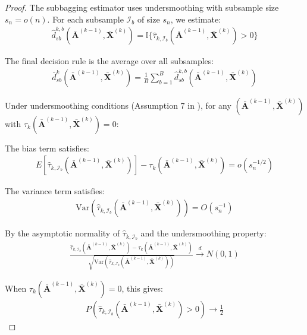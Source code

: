 \documentclass[11pt]{article}
\theoremstyle{referenceplain}
\theoremstyle{referencedefinition}
\theoremstyle{referenceremark}
\begin{document}
\begin{proof}

The subbagging estimator uses undersmoothing with subsample size $s_n = o(n)$. For each subsample $\mathcal{I}_b$ of size $s_n$, we estimate:
\begin{align*}
\widehat{d}_{sb}^{k,b}(\bar{\mathbf{A}}^{(k-1)}, \bar{\mathbf{X}}^{(k)}) = \mathbb{I}\{\widehat{\tau}_{k,\mathcal{I}_b}(\bar{\mathbf{A}}^{(k-1)}, \bar{\mathbf{X}}^{(k)}) > 0\}
\end{align*}

The final decision rule is the average over all subsamples:
\begin{align*}
\bar{d}_{sb}^{k}(\bar{\mathbf{A}}^{(k-1)}, \bar{\mathbf{X}}^{(k)}) = \frac{1}{B} \sum_{b=1}^B \widehat{d}_{sb}^{k,b}(\bar{\mathbf{A}}^{(k-1)}, \bar{\mathbf{X}}^{(k)})
\end{align*}


Under undersmoothing conditions (Assumption 7 in \citet{shi2020breaking}), for any $(\bar{\mathbf{A}}^{(k-1)}, \bar{\mathbf{X}}^{(k)})$ with $\tau_k(\bar{\mathbf{A}}^{(k-1)}, \bar{\mathbf{X}}^{(k)}) = 0$:

The bias term satisfies:
\begin{align*}
E[\widehat{\tau}_{k,\mathcal{I}_b}(\bar{\mathbf{A}}^{(k-1)}, \bar{\mathbf{X}}^{(k)})] - \tau_k(\bar{\mathbf{A}}^{(k-1)}, \bar{\mathbf{X}}^{(k)}) = o(s_n^{-1/2})
\end{align*}

The variance term satisfies:
\begin{align*}
\text{Var}(\widehat{\tau}_{k,\mathcal{I}_b}(\bar{\mathbf{A}}^{(k-1)}, \bar{\mathbf{X}}^{(k)})) = O(s_n^{-1})
\end{align*}


By the asymptotic normality of $\widehat{\tau}_{k,\mathcal{I}_b}$ and the undersmoothing property:
\begin{align*}
\frac{\widehat{\tau}_{k,\mathcal{I}_b}(\bar{\mathbf{A}}^{(k-1)}, \bar{\mathbf{X}}^{(k)}) - \tau_k(\bar{\mathbf{A}}^{(k-1)}, \bar{\mathbf{X}}^{(k)})}{\sqrt{\text{Var}(\widehat{\tau}_{k,\mathcal{I}_b}(\bar{\mathbf{A}}^{(k-1)}, \bar{\mathbf{X}}^{(k)}))}} \xrightarrow{d} N(0,1)
\end{align*}

When $\tau_k(\bar{\mathbf{A}}^{(k-1)}, \bar{\mathbf{X}}^{(k)}) = 0$, this gives:
\begin{align*}
P(\widehat{\tau}_{k,\mathcal{I}_b}(\bar{\mathbf{A}}^{(k-1)}, \bar{\mathbf{X}}^{(k)}) > 0) \to \frac{1}{2}
\end{align*}


\end{proof}
\end{document}
